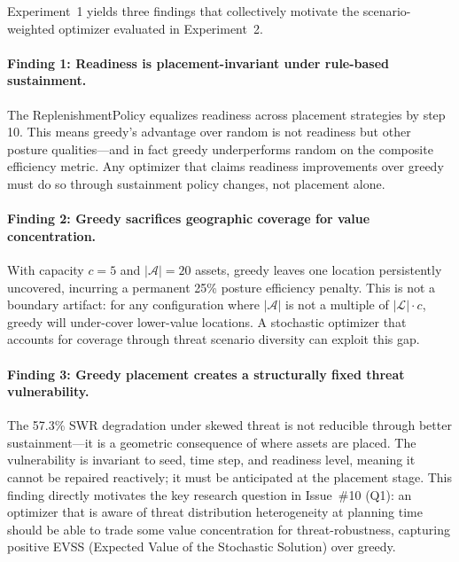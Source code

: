 \documentclass[11pt]{article}
\begin{document}
Experiment~1 yields three findings that collectively motivate the
scenario-weighted optimizer evaluated in Experiment~2.

\paragraph{Finding 1: Readiness is placement-invariant under rule-based sustainment.}
The ReplenishmentPolicy equalizes readiness across placement strategies by
step 10. This means greedy's advantage over random is not readiness but
other posture qualities---and in fact greedy underperforms random on the
composite efficiency metric. Any optimizer that claims readiness improvements
over greedy must do so through sustainment policy changes, not placement alone.

\paragraph{Finding 2: Greedy sacrifices geographic coverage for value concentration.}
With capacity $c = 5$ and $|\mathcal{A}| = 20$ assets, greedy leaves one
location persistently uncovered, incurring a permanent 25\% posture
efficiency penalty. This is not a boundary artifact: for any configuration
where $|\mathcal{A}|$ is not a multiple of $|\mathcal{L}| \cdot c$,
greedy will under-cover lower-value locations. A stochastic optimizer that
accounts for coverage through threat scenario diversity can exploit this gap.

\paragraph{Finding 3: Greedy placement creates a structurally fixed threat vulnerability.}
The 57.3\% SWR degradation under skewed threat is not reducible through
better sustainment---it is a geometric consequence of where assets are placed.
The vulnerability is invariant to seed, time step, and readiness level, meaning
it cannot be repaired reactively; it must be anticipated at the placement stage.
This finding directly motivates the key research question in Issue~\#10 (Q1):
an optimizer that is aware of threat distribution heterogeneity at planning
time should be able to trade some value concentration for threat-robustness,
capturing positive EVSS (Expected Value of the Stochastic Solution)
over greedy.

\end{document}
